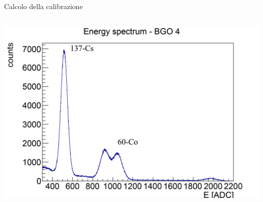 \documentclass [xcolor=svgnames, 9pt] {beamer}
\begin{document}
\begin{frame}{Calcolo della calibrazione}
	\begin{columns}%
		\begin{column}{0.53\textwidth}%
				\centering
				\includegraphics[width=\linewidth]{img/ex1775.pdf}
				\begin{figure}
						\begin{table}[ht!]
						\centering
				\end{table}\end{figure}
			

\end{column}
\end{columns}
\end{frame}
\end{document}
